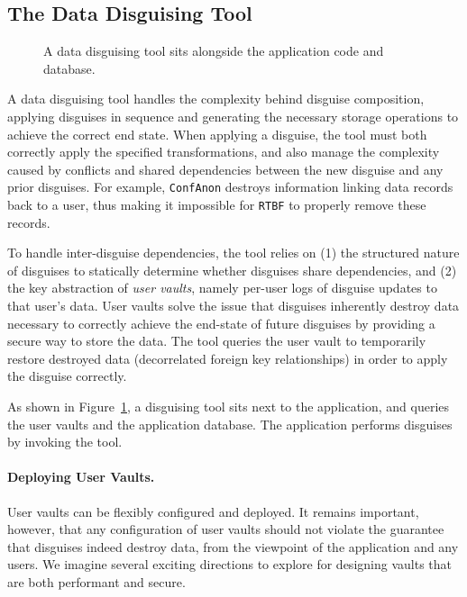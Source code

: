 \subsection{The Data Disguising Tool}
\label{sec:composition}
\begin{figure}[t!]
    \centering

    \caption{A data disguising tool sits alongside the application code and database.}
    \label{fig:tool}
\end{figure}


A data disguising tool handles the complexity behind disguise composition, applying disguises in
sequence and generating the necessary storage operations to achieve the correct end state. 
When applying a disguise, the tool must both correctly apply the specified transformations, and also
manage the complexity caused by conflicts and shared dependencies between the new disguise and any
prior disguises.  For example, \texttt{ConfAnon} destroys information linking data records back to a
user, thus making it impossible for \texttt{RTBF} to properly remove these records. 

To handle inter-disguise dependencies, the tool relies on (1) the structured nature of disguises to
statically determine whether disguises share dependencies, and (2) the key abstraction of \emph{user
vaults}, namely per-user logs of disguise updates to that user's data.  User vaults solve the issue
that disguises inherently destroy data necessary to correctly achieve the end-state of future
disguises by providing a secure way to store the data. The tool queries the user vault to
temporarily restore destroyed data (\eg decorrelated foreign key relationships) in order to apply
the disguise correctly.

As shown in Figure~\ref{fig:tool}, a disguising tool sits next to the application, and queries the
user vaults and the application database. The application performs disguises by invoking the tool. 

\paragraph{Deploying User Vaults.}
User vaults can be flexibly configured and deployed. It remains important, however, that any
configuration of user vaults should not violate the guarantee that disguises indeed destroy data,
from the viewpoint of the application and any users. 
We imagine several exciting directions to explore for designing vaults that are both
performant and secure.
%


